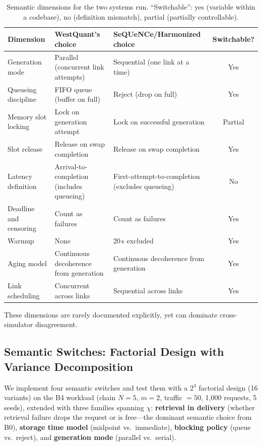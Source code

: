 \documentclass{ams-journal}
\begin{document}
\begin{table}[t]
\centering
\caption{Semantic dimensions for the two systems run. ``Switchable'': yes (variable within a codebase), no (definition mismatch), partial (partially controllable).}
\label{tab:semantics}
\footnotesize
\begin{tabularx}{\textwidth}{p{3cm}XXc}
\toprule
Dimension & WestQuant's choice & SeQUeNCe/Harmonized choice & Switchable? \\
\midrule
Generation mode & Parallel (concurrent link attempts) & Sequential (one link at a time) & Yes \\
Queueing discipline & FIFO queue (buffer on full) & Reject (drop on full) & Yes \\
Memory slot locking & Lock on generation attempt & Lock on successful generation & Partial \\
Slot release & Release on swap completion & Release on swap completion & Yes \\
Latency definition & Arrival-to-completion (includes queueing) & First-attempt-to-completion (excludes queueing) & No \\
Deadline and censoring & Count as failures & Count as failures & Yes \\
Warmup & None & 20\,s excluded & Yes \\
Aging model & Continuous decoherence from generation & Continuous decoherence from generation & Yes \\
Link scheduling & Concurrent across links & Sequential across links & Yes \\
\bottomrule
\end{tabularx}
\end{table}

These dimensions are rarely documented explicitly, yet can dominate cross-simulator disagreement.

\subsection{Semantic Switches: Factorial Design with Variance Decomposition}
\label{sec:switches_1000}

We implement four semantic switches and test them with a $2^4$ factorial design (16 variants) on the B4 workload (chain $N=5$, $m=2$, traffic $=50$, 1{,}000 requests, 5 seeds), extended with three families spanning $\chi$: \textbf{retrieval in delivery} (whether retrieval failure drops the request or is free---the dominant semantic choice from B0), \textbf{storage time model} (midpoint vs.\ immediate), \textbf{blocking policy} (queue vs.\ reject), and \textbf{generation mode} (parallel vs.\ serial).
\end{document}
